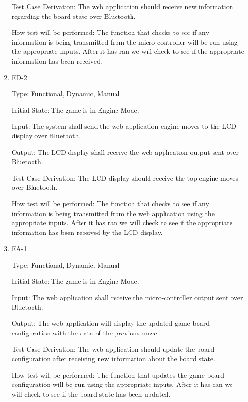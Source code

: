 \documentclass[12pt, titlepage]{article}
\begin{document}
\begin{enumerate}
      Test Case Derivation: The web application should receive new information regarding the board state over Bluetooth. 
  
      How test will be performed: The function that checks to see if any information is being transmitted from the micro-controller
      will be run using the appropriate inputs. After it has ran we will check to see if the appropriate information has been received.
  
      \item{ED-2\\}
  
      Type: Functional, Dynamic, Manual
                        
      Initial State: The game is in Engine Mode.
                          
      Input: The system shall send the web application engine moves to the LCD display over Bluetooth.
                          
      Output: The LCD display shall receive the web application output sent over Bluetooth.
                          
      Test Case Derivation: The LCD display should receive the top engine moves over Bluetooth. 
  
      How test will be performed: The function that checks to see if any information is being transmitted from the web application 
      using the appropriate inputs. After it has ran we will check to see if the appropriate information has been received by the LCD display.
  
      \item{EA-1\\}
  
      Type: Functional, Dynamic, Manual
                        
      Initial State: The game is in Engine Mode.
                          
      Input: The web application shall receive the micro-controller output sent over Bluetooth.
                          
      Output: The web application will display the updated game board configuration with the data
      of the previous move
                          
      Test Case Derivation: The web application should update the board configuration after receiving new information about the board state. 
  
      How test will be performed: The function that updates the game board configuration
      will be run using the appropriate inputs. After it has ran we will check to see if the board state has been updated.
  

\end{enumerate}
\end{document}
